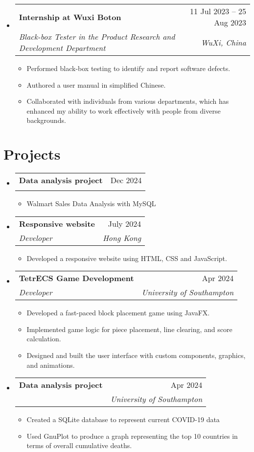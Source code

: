 \documentclass[letterpaper,10pt]{article}
\makeatletter
\newcommand{\resumeItem}[1]{
  \item\small{
    {#1 \vspace{-2pt}}
  }
}
\newcommand{\resumeSubheading}[4]{
  \vspace{-2pt}\item
    \begin{tabular*}{0.97\textwidth}[t]{l@{\extracolsep{\fill}}r}
      \textbf{#1} & #2 \\
      \textit{\small#3} & \textit{\small #4} \\
    \end{tabular*}\vspace{-7pt}
}
\newcommand{\resumeSubHeadingListStart}{\begin{itemize}[leftmargin=0.15in, label={}]}
\newcommand{\resumeSubHeadingListEnd}{\end{itemize}}
\newcommand{\resumeItemListStart}{\begin{itemize}}
\newcommand{\resumeItemListEnd}{\end{itemize}\vspace{-5pt}}
\makeatother
\begin{document}
\resumeSubHeadingListStart
    \resumeSubheading
      {Internship at Wuxi Boton}{11 Jul 2023 -- 25 Aug 2023}
      {Black-box Tester in the Product Research and Development Department}{WuXi, China}
      \resumeItemListStart
        \resumeItem{Performed black-box testing to identify and report software defects.}
        \resumeItem{Authored a user manual in simplified Chinese.}
        \resumeItem{Collaborated with individuals from various departments, which has enhanced my ability to work effectively with people from diverse backgrounds.}
      \resumeItemListEnd
\resumeSubHeadingListEnd
\vspace{10mm}

\section{Projects}

\resumeSubHeadingListStart
    \resumeSubheading
      {Data analysis project}{Dec 2024}
      {}{}
      \resumeItemListStart
        \resumeItem{Walmart Sales Data Analysis with MySQL}
      \resumeItemListEnd
\resumeSubHeadingListEnd

\resumeSubHeadingListStart
    \resumeSubheading
      {Responsive website}{July 2024}
      {Developer}{Hong Kong}
      \resumeItemListStart
        \resumeItem{Developed a responsive website using HTML, CSS and JavaScript.}
      \resumeItemListEnd
\resumeSubHeadingListEnd

\resumeSubHeadingListStart
    \resumeSubheading
      {TetrECS Game Development}{Apr 2024}
      {Developer}{University of Southampton}
      \resumeItemListStart
        \resumeItem{Developed a fast-paced block placement game using JavaFX.}
        \resumeItem{Implemented game logic for piece placement, line clearing, and score calculation.}
        \resumeItem{Designed and built the user interface with custom components, graphics, and animations.}
      \resumeItemListEnd
\resumeSubHeadingListEnd

\resumeSubHeadingListStart
    \resumeSubheading
      {Data analysis project}{Apr 2024}
      {}{University of Southampton}
      \resumeItemListStart
        \resumeItem{Created a SQLite database to represent current COVID-19 data}
        \resumeItem{Used GnuPlot to produce a graph representing the top 10 countries in terms of overall cumulative deaths.}
      \resumeItemListEnd
\resumeSubHeadingListEnd
\end{document}
